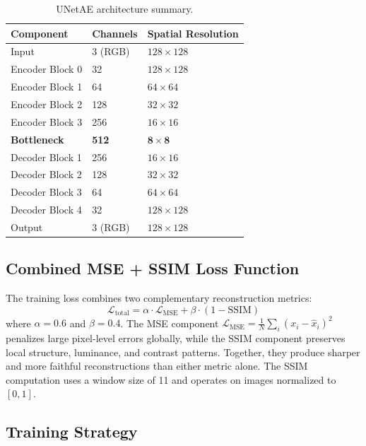 \documentclass{article}
\begin{document}
\begin{table}[htbp]
  \caption{UNetAE architecture summary.}
  \label{tab:architecture}
  \centering
  \begin{tabular}{lll}
    \toprule
    Component & Channels & Spatial Resolution \\
    \midrule
    Input            & 3 (RGB) & $128 \times 128$ \\
    Encoder Block 0  & 32      & $128 \times 128$ \\
    Encoder Block 1  & 64      & $64 \times 64$   \\
    Encoder Block 2  & 128     & $32 \times 32$   \\
    Encoder Block 3  & 256     & $16 \times 16$   \\
    \textbf{Bottleneck} & \textbf{512} & $\mathbf{8 \times 8}$ \\
    Decoder Block 1  & 256     & $16 \times 16$   \\
    Decoder Block 2  & 128     & $32 \times 32$   \\
    Decoder Block 3  & 64      & $64 \times 64$   \\
    Decoder Block 4  & 32      & $128 \times 128$ \\
    Output           & 3 (RGB) & $128 \times 128$ \\
    \bottomrule
  \end{tabular}
\end{table}

\subsection{Combined MSE + SSIM Loss Function}

The training loss combines two complementary reconstruction metrics:
\begin{equation}
    \mathcal{L}_\text{total} = \alpha \cdot \mathcal{L}_\text{MSE} + \beta \cdot (1 - \text{SSIM})
\end{equation}
where $\alpha = 0.6$ and $\beta = 0.4$. The MSE component $\mathcal{L}_\text{MSE} = \frac{1}{N}\sum_{i}(x_i - \hat{x}_i)^2$ penalizes large pixel-level errors globally, while the SSIM component \citep{wang2004image} preserves local structure, luminance, and contrast patterns. Together, they produce sharper and more faithful reconstructions than either metric alone. The SSIM computation uses a window size of 11 and operates on images normalized to $[0, 1]$.

\subsection{Training Strategy}
\end{document}
